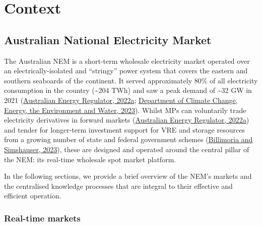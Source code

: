 \documentclass[12pt,a4paper,]{report}
\begin{document}
\hypertarget{sec:info-context}{%
\section{Context}\label{sec:info-context}}

\hypertarget{sec:info-context-nem}{%
\subsection{Australian National Electricity
Market}\label{sec:info-context-nem}}

The Australian NEM is a short-term wholesale electricity market operated
over an electrically-isolated and ``stringy'' power system that covers
the eastern and southern seaboards of the continent. It served
approximately 80\% of all electricity consumption in the country
(\textasciitilde204 TWh) and saw a peak demand of \textasciitilde32 GW
in 2021
(\protect\hyperlink{ref-australianenergyregulatorStateEnergyMarket2022}{Australian
Energy Regulator, 2022a};
\protect\hyperlink{ref-departmentofclimatechangeenergytheenvironmentandwaterNationalElectricityMarket2023}{Department
of Climate Change, Energy, the Environment and Water, 2023}). Whilst MPs
can voluntarily trade electricity derivatives in forward markets
(\protect\hyperlink{ref-australianenergyregulatorStateEnergyMarket2022}{Australian
Energy Regulator, 2022a}) and tender for longer-term investment support
for VRE and storage resources from a growing number of state and federal
government schemes
(\protect\hyperlink{ref-billimoriaContractDesignStorage2023a}{Billimoria
and Simshauser, 2023}), these are designed and operated around the
central pillar of the NEM: its real-time wholesale spot market platform.

In the following sections, we provide a brief overview of the NEM's
markets and the centralised knowledge processes that are integral to
their effective and efficient operation.

\hypertarget{sec:info-context-nem-rtm}{%
\subsubsection{Real-time markets}\label{sec:info-context-nem-rtm}}
\end{document}
